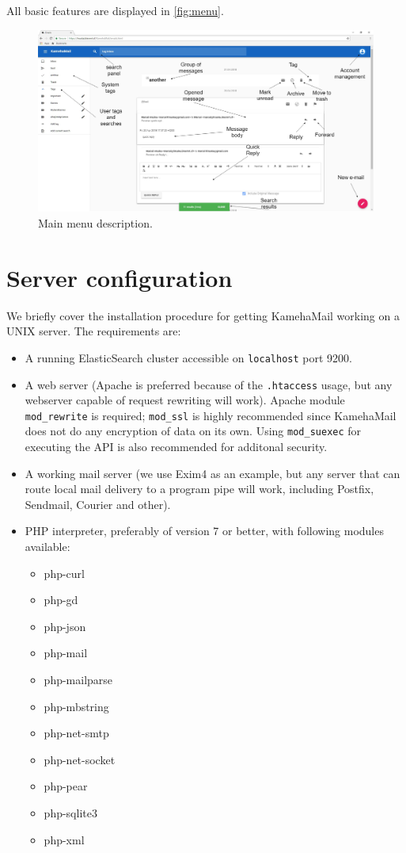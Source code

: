 All basic features are displayed in \autoref{fig:menu}.
\begin{figure}
\centering
\includegraphics[width=\textwidth]{img/menu.png}
\caption{Main menu description.}
\label{fig:menu}
\end{figure}

\section{Server configuration}

We briefly cover the installation procedure for getting KamehaMail working on a UNIX server. The requirements are:
\begin{itemize}
\item A running ElasticSearch cluster accessible on \texttt{localhost} port 9200.
\item A web server (Apache is preferred because of the \texttt{.htaccess} usage, but any webserver capable of request rewriting will work). Apache module \texttt{mod\_rewrite} is required; \texttt{mod\_ssl} is highly recommended since KamehaMail does not do any encryption of data on its own. Using \texttt{mod\_suexec} for executing the API is also recommended for additonal security.
\item A working mail server (we use Exim4 as an example, but any server that can route local mail delivery to a program pipe will work, including Postfix, Sendmail, Courier and other).
\item PHP interpreter, preferably of version 7 or better, with following modules available:
\begin{itemize}
\item php-curl
\item php-gd
\item php-json
\item php-mail
\item php-mailparse
\item php-mbstring
\item php-net-smtp
\item php-net-socket
\item php-pear
\item php-sqlite3
\item php-xml
\end{itemize}
\end{itemize}



